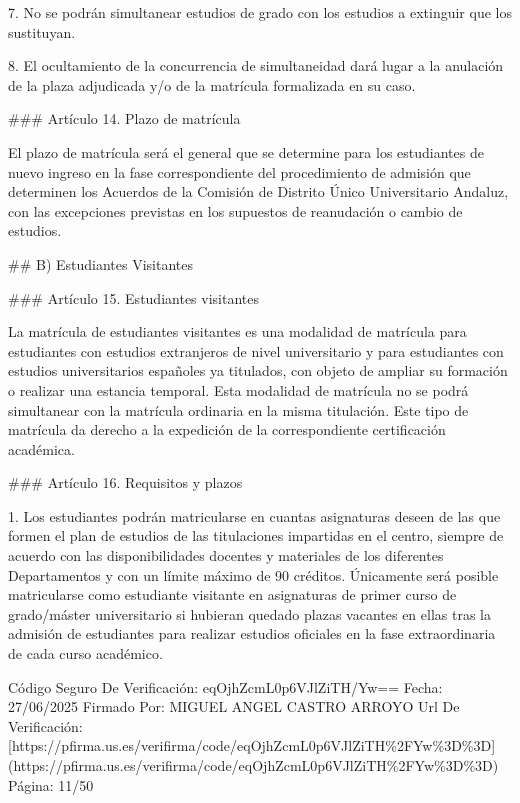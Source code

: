 \documentclass{article}
\begin{document}
\begin{itemize}
\begin{itemize}
\begin{scriptsize}
                  7. No se podrán simultanear estudios de grado con los estudios a extinguir que los sustituyan.

                  8. El ocultamiento de la concurrencia de simultaneidad dará lugar a la anulación de la plaza adjudicada y/o de la matrícula formalizada en su caso.

                  \#\#\# Artículo 14. Plazo de matrícula

                  El plazo de matrícula será el general que se determine para los estudiantes de nuevo ingreso en la fase correspondiente del procedimiento de admisión que determinen los Acuerdos de la Comisión de Distrito Único Universitario Andaluz, con las excepciones previstas en los supuestos de reanudación o cambio de estudios.

                  \#\# B) Estudiantes Visitantes

                  \#\#\# Artículo 15. Estudiantes visitantes

                  La matrícula de estudiantes visitantes es una modalidad de matrícula para estudiantes con estudios extranjeros de nivel universitario y para estudiantes con estudios universitarios españoles ya titulados, con objeto de ampliar su formación o realizar una estancia temporal. Esta modalidad de matrícula no se podrá simultanear con la matrícula ordinaria en la misma titulación. Este tipo de matrícula da derecho a la expedición de la correspondiente certificación académica.

                  \#\#\# Artículo 16. Requisitos y plazos

                  1. Los estudiantes podrán matricularse en cuantas asignaturas deseen de las que formen el plan de estudios de las titulaciones impartidas en el centro, siempre de acuerdo con las disponibilidades docentes y materiales de los diferentes Departamentos y con un límite máximo de 90 créditos. Únicamente será posible matricularse como estudiante visitante en asignaturas de primer curso de grado/máster universitario si hubieran quedado plazas vacantes en ellas tras la admisión de estudiantes para realizar estudios oficiales en la fase extraordinaria de cada curso académico.

                  Código Seguro De Verificación: eqOjhZcmL0p6VJlZiTH/Yw==
                  Fecha: 27/06/2025
                  Firmado Por: MIGUEL ANGEL CASTRO ARROYO
                  Url De Verificación: [https://pfirma.us.es/verifirma/code/eqOjhZcmL0p6VJlZiTH\%2FYw\%3D\%3D](https://pfirma.us.es/verifirma/code/eqOjhZcmL0p6VJlZiTH\%2FYw\%3D\%3D)
                  Página: 11/50


\end{scriptsize}
\end{itemize}
\end{itemize}
\end{document}
